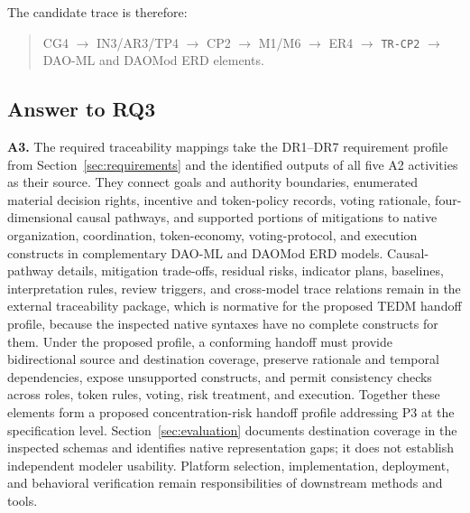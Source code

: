\documentclass[referee,sn-basic]{sn-jnl}
\begin{document}
The candidate trace is therefore:
\begin{quote}
CG4 $\rightarrow$ IN3/AR3/TP4 $\rightarrow$ CP2 $\rightarrow$ M1/M6
$\rightarrow$ ER4 $\rightarrow$ \texttt{TR-CP2} $\rightarrow$
DAO-ML and DAOMod ERD elements.
\end{quote}

\FloatBarrier
\subsection{Answer to RQ3}\label{subsec:answer-rq3}

\textbf{A3.} The required traceability mappings take the DR1--DR7 requirement
profile from Section~\ref{sec:requirements} and the identified outputs of all five A2 activities as their
source. They connect goals and authority boundaries, enumerated material decision rights,
incentive and token-policy records, voting rationale, four-dimensional causal
pathways, and supported portions of mitigations to native organization,
coordination, token-economy, voting-protocol, and execution constructs in
complementary DAO-ML and DAOMod ERD models. Causal-pathway details, mitigation
trade-offs, residual risks, indicator plans, baselines, interpretation rules,
review triggers, and cross-model trace relations remain in the external
traceability package, which is normative for the proposed TEDM handoff profile,
because the inspected native syntaxes have no
complete constructs for them. Under the proposed profile, a conforming handoff
must provide bidirectional source and destination coverage, preserve rationale
and temporal dependencies, expose unsupported constructs, and permit consistency checks
across roles, token rules, voting, risk treatment, and execution. Together these
elements form a proposed concentration-risk handoff profile addressing P3 at
the specification level. Section~\ref{sec:evaluation} documents destination
coverage in the inspected schemas and identifies native representation gaps; it does not
establish independent modeler usability. Platform selection, implementation,
deployment, and behavioral verification remain responsibilities of downstream
methods and tools.

\end{document}
